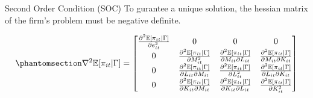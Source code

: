 \documentclass[
  ignorenonframetext,
  aspectratio=169,
]{beamer}
\begin{document}
\begin{frame}{Second Order Condition (SOC)}
\protect{}\label{second-order-condition-soc}
To gurantee a unique solution, the hessian matrix of the firm's problem
must be negative definite.

\begin{equation}\protect\phantomsection\label{eq-soc-e}{
\nabla^2 \mathbb{E}[\pi_{it}|\Gamma] = \begin{bmatrix}
\frac{\partial^2 \mathbb{E}[\pi_{it}|\Gamma]}{\partial e_{it}^2} & 0 & 0 & 0  \\
0 & \frac{\partial^2 \mathbb{E}[\pi_{it}|\Gamma]}{\partial M_{it}^2} & \frac{\partial^2 \mathbb{E}[\pi_{it}|\Gamma]}{\partial M_{it}\partial L_{it}} & \frac{\partial^2 \mathbb{E}[\pi_{it}|\Gamma]}{\partial M_{it}\partial K_{it}} \\
0 & \frac{\partial^2 \mathbb{E}[\pi_{it}|\Gamma]}{\partial L_{it}\partial M_{it}} & \frac{\partial^2 \mathbb{E}[\pi_{it}|\Gamma]}{\partial L_{it}^2} & \frac{\partial^2 \mathbb{E}[\pi_{it}|\Gamma]}{\partial L_{it}\partial K_{it}} \\
0 & \frac{\partial^2 \mathbb{E}[\pi_{it}|\Gamma]}{\partial K_{it}\partial M_{it}} & \frac{\partial^2 \mathbb{E}[\pi_{it}|\Gamma]}{\partial K_{it}\partial L_{it}} & \frac{\partial^2 \mathbb{E}[\pi_{it}|\Gamma]}{\partial K_{it}^2}    
\end{bmatrix}
}\end{equation}
\end{frame}
\end{document}
